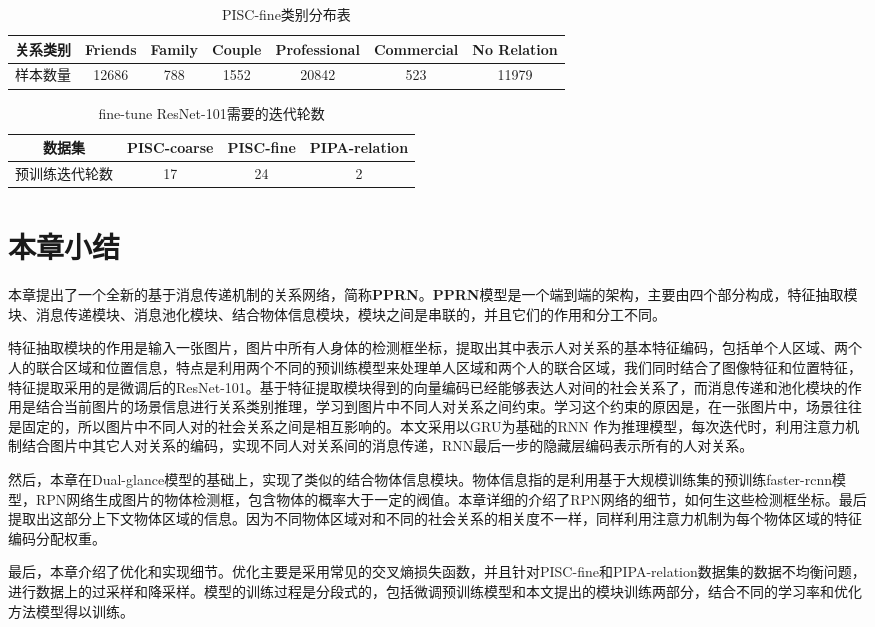 \begin{table}[htpb]
  \centering
  \caption{PISC-fine类别分布表}
  \label{tab:model-pisc-cls}
  \begin{tabular}{c|c|c|c|c|c|c}
    \toprule
    关系类别 & Friends & Family & Couple & Professional & Commercial & No Relation \\
    \midrule
    样本数量 & 12686 & 788 & 1552 & 20842 & 523 & 11979 \\
    \bottomrule
  \end{tabular}
\end{table}


\begin{table}[htpb]
  \centering
  \caption{fine-tune ResNet-101需要的迭代轮数}
  \label{tab:model-ft-epoch}
  \begin{tabular}{c|c|c|c}
    \toprule
    数据集 & PISC-coarse & PISC-fine  & PIPA-relation \\
    \midrule
    预训练迭代轮数 & 17 & 24 & 2 \\
    \midrule
    \bottomrule
  \end{tabular}
\end{table}

\section{本章小结}

本章提出了一个全新的基于消息传递机制的关系网络，简称\textbf{PPRN}。\textbf{PPRN}模型是一个端到端的架构，主要由四个部分构成，特征抽取模块、消息传递模块、消息池化模块、结合物体信息模块，模块之间是串联的，并且它们的作用和分工不同。

特征抽取模块的作用是输入一张图片，图片中所有人身体的检测框坐标，提取出其中表示人对关系的基本特征编码，包括单个人区域、两个人的联合区域和位置信息，特点是利用两个不同的预训练模型来处理单人区域和两个人的联合区域，我们同时结合了图像特征和位置特征，特征提取采用的是微调后的ResNet-101。基于特征提取模块得到的向量编码已经能够表达人对间的社会关系了，而消息传递和池化模块的作用是结合当前图片的场景信息进行关系类别推理，学习到图片中不同人对关系之间约束。学习这个约束的原因是，在一张图片中，场景往往是固定的，所以图片中不同人对的社会关系之间是相互影响的。本文采用以GRU为基础的RNN 作为推理模型，每次迭代时，利用注意力机制结合图片中其它人对关系的编码，实现不同人对关系间的消息传递，RNN最后一步的隐藏层编码表示所有的人对关系。

然后，本章在Dual-glance模型的基础上，实现了类似的结合物体信息模块。物体信息指的是利用基于大规模训练集的预训练faster-rcnn模型，RPN网络生成图片的物体检测框，包含物体的概率大于一定的阀值。本章详细的介绍了RPN网络的细节，如何生这些检测框坐标。最后提取出这部分上下文物体区域的信息。因为不同物体区域对和不同的社会关系的相关度不一样，同样利用注意力机制为每个物体区域的特征编码分配权重。

最后，本章介绍了优化和实现细节。优化主要是采用常见的交叉熵损失函数，并且针对PISC-fine和PIPA-relation数据集的数据不均衡问题，进行数据上的过采样和降采样。模型的训练过程是分段式的，包括微调预训练模型和本文提出的模块训练两部分，结合不同的学习率和优化方法模型得以训练。




